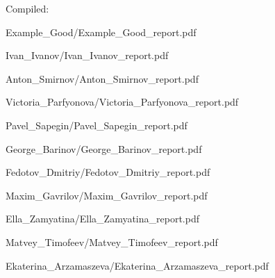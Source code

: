 \documentclass[a4paper]{article}
\begin{document}
Compiled: \DTMnow
\tableofcontents

\clearpage

{Example_Good/Example_Good_report.pdf}

{Ivan_Ivanov/Ivan_Ivanov_report.pdf}

{Anton_Smirnov/Anton_Smirnov_report.pdf}

{Victoria_Parfyonova/Victoria_Parfyonova_report.pdf}

{Pavel_Sapegin/Pavel_Sapegin_report.pdf}

{George_Barinov/George_Barinov_report.pdf}

{Fedotov_Dmitriy/Fedotov_Dmitriy_report.pdf}

{Maxim_Gavrilov/Maxim_Gavrilov_report.pdf}

{Ella_Zamyatina/Ella_Zamyatina_report.pdf}

{Matvey_Timofeev/Matvey_Timofeev_report.pdf}

{Ekaterina_Arzamaszeva/Ekaterina_Arzamaszeva_report.pdf}
\end{document}
